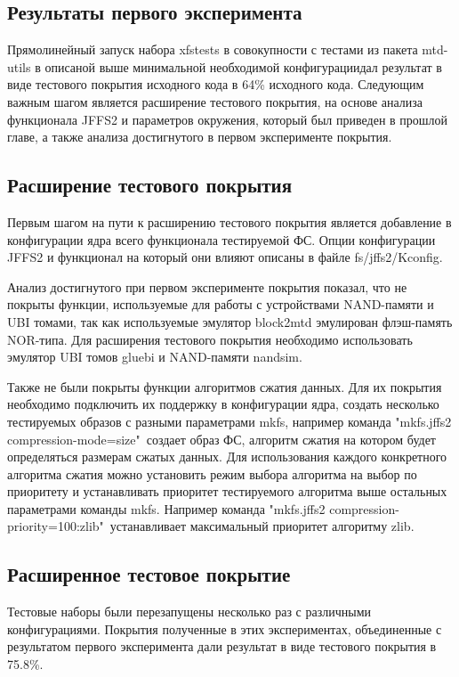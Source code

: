 \subsection{Результаты первого эксперимента}

Прямолинейный запуск набора xfstests в совокупности с тестами из пакета mtd-utils в описаной выше минимальной необходимой конфигурациидал результат в виде тестового покрытия исходного кода в 64\% исходного кода. Следующим важным шагом является расширение тестового покрытия, на основе анализа функционала JFFS2 и параметров окружения, который был приведен в прошлой главе, а также анализа достигнутого в первом эксперименте покрытия.

\subsection{Расширение тестового покрытия}

Первым шагом на пути к расширению тестового покрытия является добавление в конфигурации ядра всего функционала тестируемой ФС. Опции конфигурации JFFS2 и функционал на который они влияют описаны в файле fs/jffs2/Kconfig.

Анализ достигнутого при первом эксперименте покрытия показал, что не покрыты функции, используемые для работы с устройствами NAND-памяти и UBI томами, так как используемые эмулятор block2mtd эмулирован флэш-память NOR-типа. Для расширения тестового покрытия необходимо использовать эмулятор UBI томов gluebi и NAND-памяти nandsim.

Также не были покрыты функции алгоритмов сжатия данных. Для их покрытия необходимо подключить их поддержку в конфигурации ядра, создать несколько тестируемых образов с разными параметрами mkfs, например команда "mkfs.jffs2 \-\-compression-mode=size"\ создает образ ФС, алгоритм сжатия на котором будет определяться размерам сжатых данных. Для использования каждого конкретного алгоритма сжатия можно установить режим выбора алгоритма на выбор по приоритету и устанавливать приоритет тестируемого алгоритма выше остальных параметрами команды mkfs. Например команда "mkfs.jffs2 \-\-compression-priority=100:zlib"\ устанавливает максимальный приоритет алгоритму zlib.

\subsection{Расширенное тестовое покрытие}

Тестовые наборы были перезапущены несколько раз с различными конфигурациями. Покрытия полученные в этих экспериментах, объединенные с результатом первого эксперимента дали результат в виде тестового покрытия в 75.8\%.

